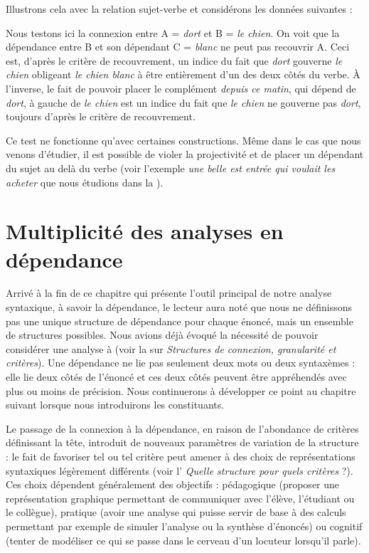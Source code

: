 \begin{sloppypar}
Illustrons cela avec la relation sujet-verbe et considérons les données suivantes :
\end{sloppypar}

\ea
  \z
\z

Nous testons ici la connexion entre A = \textit{dort} et B = \textit{le chien}. On voit que la dépendance entre B et son dépendant C = \textit{blanc} ne peut pas recouvrir A. Ceci est, d'après le critère de recouvrement, un indice du fait que \textit{dort} gouverne \textit{le chien} obligeant \textit{le chien blanc} à être entièrement d’un des deux côtés du verbe. À l’inverse, le fait de pouvoir placer le complément \textit{depuis ce matin}, qui dépend de \textit{dort}, à gauche de \textit{le chien} est un indice du fait que \textit{le chien} ne gouverne pas \textit{dort}, toujours d'après le critère de recouvrement.

Ce test ne fonctionne qu’avec certaines constructions. Même dans le cas que nous venons d’étudier, il est possible de violer la projectivité et de placer un dépendant du sujet au delà du verbe (voir l’exemple \textit{une belle est entrée qui voulait les acheter} que nous étudions dans la ).

\section{Multiplicité des analyses en dépendance}\label{sec:3.3.33}

Arrivé à la fin de ce chapitre qui présente l’outil principal de notre analyse syntaxique, à savoir la dépendance, le lecteur aura noté que nous ne définissons pas une unique structure de dépendance pour chaque énoncé, mais un ensemble de structures possibles. Nous avions déjà évoqué la nécessité de pouvoir considérer une analyse à  (voir la  sur \textit{Structures de connexion, granularité et critères}). Une dépendance ne lie pas seulement deux mots ou deux syntaxèmes : elle lie deux côtés de l’énoncé et ces deux côtés peuvent être appréhendés avec plus ou moins de précision. Nous continuerons à développer ce point au chapitre suivant lorsque nous introduirons les constituants.

Le passage de la connexion à la dépendance, en raison de l’abondance de critères définissant la tête, introduit de nouveaux paramètres de variation de la structure : le fait de favoriser tel ou tel critère peut amener à des choix de représentations syntaxiques légèrement différents (voir l’ \textit{Quelle structure pour quels critères} ?). Ces choix dépendent généralement des objectifs : pédagogique (proposer une représentation graphique permettant de communiquer avec l’élève, l’étudiant ou le collègue), pratique (avoir une analyse qui puisse servir de base à des calculs permettant par exemple de simuler l’analyse ou la synthèse d’énoncés) ou cognitif (tenter de modéliser ce qui se passe dans le cerveau d’un locuteur lorsqu’il parle).

